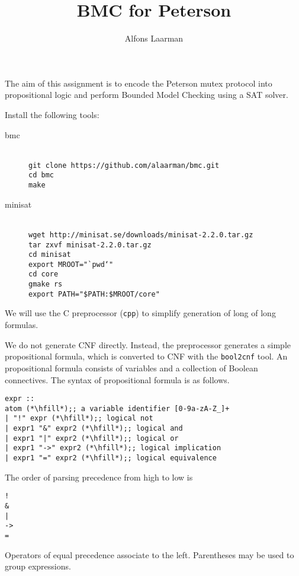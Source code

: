 \documentclass[12pt]{article}
\begin{document}
	\title{BMC for Peterson}
	\author{Alfons Laarman}
	
	\maketitle

The aim of this assignment is to encode the Peterson mutex protocol
into propositional logic and perform Bounded Model Checking using
a SAT solver.

Install the following tools:
\begin{description}
\item[bmc] ~\\\texttt{git clone {https://github.com/alaarman/bmc.git}}\\
			\texttt{cd bmc\\make}
\item[minisat] ~\\\texttt{wget http://minisat.se/downloads/minisat-2.2.0.tar.gz}\\
				\texttt{tar zxvf minisat-2.2.0.tar.gz}\\
				\texttt{cd minisat\\export MROOT="`pwd`"}\\
				\texttt{cd core\\gmake rs}\\
				\texttt{export PATH="\$PATH:\$MROOT/core"}
\end{description}





We will use the C preprocessor (\texttt{cpp}) to simplify generation of long of
long formulas.

We do not generate CNF directly. Instead, the preprocessor generates 
a simple propositional formula, which is converted to CNF with the \texttt{bool2cnf} tool.
An propositional formula consists of variables and a collection of Boolean connectives.
The syntax of propositional formula is as follows.

\begin{lstlisting}
expr ::
atom (*\hfill*);; a variable identifier [0-9a-zA-Z_]+
| "!" expr (*\hfill*);; logical not
| expr1 "&" expr2 (*\hfill*);; logical and
| expr1 "|" expr2 (*\hfill*);; logical or
| expr1 "->" expr2 (*\hfill*);; logical implication
| expr1 "=" expr2 (*\hfill*);; logical equivalence
\end{lstlisting}

The order of parsing precedence from high to low is
\begin{lstlisting}
!
&
|
->
=
\end{lstlisting}
Operators of equal precedence associate to the left. Parentheses may be used to group expressions.
\end{document}

